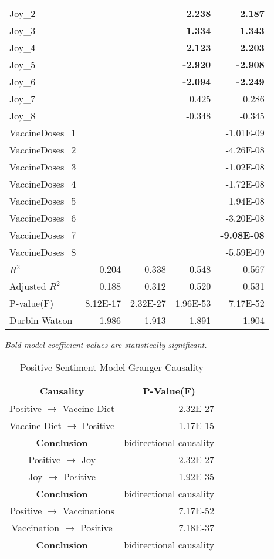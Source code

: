 \begin{longtable}[c]{@{}lrrrr@{}}
Joy\_2 &  &  & \textbf{2.238} & \textbf{2.187} \\
Joy\_3 &  &  & \textbf{1.334} & \textbf{1.343} \\
Joy\_4 &  &  & \textbf{2.123} & \textbf{2.203} \\
Joy\_5 &  &  & \textbf{-2.920} & \textbf{-2.908} \\
Joy\_6 &  &  & \textbf{-2.094} & \textbf{-2.249} \\
Joy\_7 &  &  & 0.425 & 0.286 \\
Joy\_8 &  &  & -0.348 & -0.345 \\
VaccineDoses\_1 &  &  &  & -1.01E-09 \\
VaccineDoses\_2 &  &  &  & -4.26E-08 \\
VaccineDoses\_3 &  &  &  & -1.02E-08 \\
VaccineDoses\_4 &  &  &  & -1.72E-08 \\
VaccineDoses\_5 &  &  &  & 1.94E-08 \\
VaccineDoses\_6 &  &  &  & -3.20E-08 \\
VaccineDoses\_7 &  &  &  & \textbf{-9.08E-08} \\
VaccineDoses\_8 &  &  &  & -5.59E-09 \\
$R^2$ & 0.204 & 0.338 & 0.548 & 0.567 \\
Adjusted $R^2$ & 0.188 & 0.312 & 0.520 & 0.531 \\
P-value(F) & 8.12E-17 & 2.32E-27 & 1.96E-53 & 7.17E-52 \\
Durbin-Watson & 1.986 & 1.913 & 1.891 & 1.904 \\* \bottomrule
\end{longtable}
\emph{Bold model coefficient values are statistically significant.}



\begin{table}[H]
\centering
\begin{tabular}{@{}cr@{}}
\toprule
\textbf{Causality} & \multicolumn{1}{c}{\textbf{P-Value(F)}} \\ \midrule
Positive   $\rightarrow$ Vaccine Dict & 2.32E-27 \\
Vaccine Dict $\rightarrow$  Positive & 1.17E-15 \\
\textbf{Conclusion} & bidirectional causality \\
Positive   $\rightarrow$  Joy & 2.32E-27 \\
Joy $\rightarrow$  Positive & 1.92E-35 \\
\textbf{Conclusion} & bidirectional causality \\
Positive   $\rightarrow$  Vaccinations & 7.17E-52 \\
Vaccination $\rightarrow$  Positive & 7.18E-37 \\
\textbf{Conclusion} & bidirectional causality \\
\bottomrule
\end{tabular}
\caption{Positive Sentiment Model Granger Causality}
\label{tab:model 3 causality}
\end{table}

